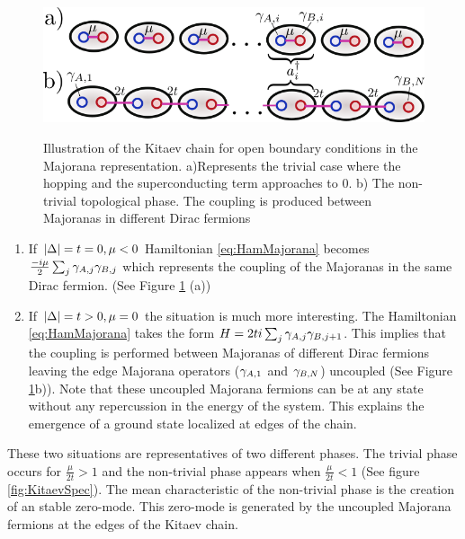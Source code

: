 \begin{figure}[hbt]
    \centering
    \includegraphics[scale=0.5]{IMAGES/Majorana/KitaevChain.png}
    \label{fig:top.phases kitaev}
    \caption{Illustration of the Kitaev chain for open boundary conditions in the Majorana representation. a)Represents the trivial case where the hopping and the superconducting term approaches to $0$. b) The non-trivial topological phase. The coupling is produced between Majoranas in different Dirac fermions \protect{} }
\end{figure}


\begin{enumerate}
\item{If $\vert \Delta \vert = t = 0, \mu <0$} Hamiltonian \eqref{eq:HamMajorana} becomes $\frac{-i\mu}{2} \sum_{j} \gamma_{A,j}\gamma_{B,j}$ which represents the coupling of the Majoranas in the same Dirac fermion. (See Figure \ref{fig:top.phases kitaev} (a))

\item{If $\vert \Delta \vert = t > 0, \mu =0$} the situation is much more interesting. The Hamiltonian \eqref{eq:HamMajorana} takes the form $H = 2ti\sum_{j} \gamma_{A,j}\gamma_{B,j+1}$. This implies that the coupling is performed between  Majoranas of different Dirac fermions leaving the edge Majorana operators ($\gamma_{A,1}$ and $\gamma_{B,N}$) uncoupled (See Figure \ref{fig:top.phases kitaev}b)). Note that these uncoupled Majorana fermions can be at any state without any  repercussion in the energy of the system. This explains the emergence of a  ground state localized at edges of the chain. 
\end{enumerate}

These two situations are representatives of two different phases. The trivial phase occurs for $\frac{\mu}{2t}>1$ and the non-trivial phase appears when $\frac{\mu}{2t}<1$ (See figure \ref{fig:KitaevSpec}). The mean characteristic of the non-trivial phase is the creation of an stable zero-mode. This zero-mode is generated by the  uncoupled Majorana fermions at the edges of the Kitaev chain.  \\



